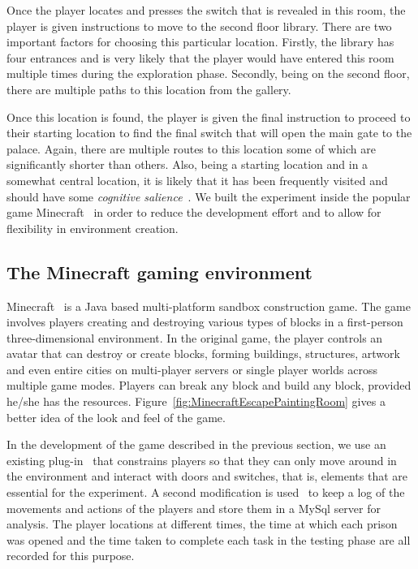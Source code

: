 Once the player locates and presses the switch that is revealed in this room, the player is given instructions to move to the second floor library. There are two important factors for choosing this particular location. Firstly, the library has four entrances and is very likely that the player would have entered this room multiple times during the exploration phase. Secondly, being on the second floor, there are multiple paths to this location from the gallery.

Once this location is found, the player is given the final instruction to proceed to their starting location to find the final switch that will open the main gate to the palace. Again, there are multiple routes to this location some of which are significantly shorter than others. Also, being a starting location and in a somewhat central location, it is likely that it has been frequently visited and should have some \emph{cognitive salience}~\cite{Davis01122009}. We built the experiment inside the popular game Minecraft~\cite{Minecraft} in order to reduce the development effort and to allow for flexibility in environment creation.


\subsection{The Minecraft gaming environment}
\label{sec:the_minecraft_gaming_environment}

Minecraft~\cite{Minecraft} is a Java based multi-platform sandbox construction game. The game involves players creating and destroying various types of blocks in a first-person three-dimensional environment. In the original game, the player controls an avatar that can destroy or create blocks, forming buildings, structures, artwork and even entire cities on multi-player servers or single player worlds across multiple game modes. Players can break any block and build any block, provided he/she has the resources. Figure~\ref{fig:MinecraftEscapePaintingRoom} gives a better idea of the look and feel of the game.


In the development of the game described in the previous section, we use an existing plug-in~\cite{BukkitPermissions} that constrains players so that they can only move around in the environment and interact with doors and switches, that is, elements that are essential for the experiment. A second modification is used~\cite{MyStatisticsPlugin} to keep a log of the movements and actions of the players and store them in a MySql server for analysis. The player locations at different times, the time at which each prison was opened and the time taken to complete each task in the testing phase are all recorded for this purpose.

